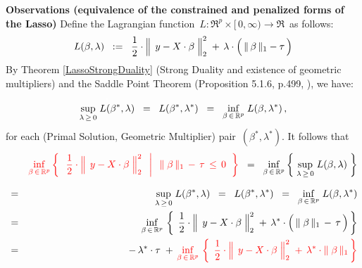 \vskip 0.5cm
\noindent
\textbf{Observations (equivalence of the constrained and penalized forms of the Lasso)}
\mbox{}
\vskip 0.2cm
\noindent
Define the Lagrangian function
\,$L : \Re^{p} \times [\,0,\infty) \longrightarrow \Re$\,
as follows:
\begin{equation*}
L(\beta,\lambda)
\;\; := \;\;
	\dfrac{1}{2}
	\cdot
	\left\Vert\;\, y \overset{{\color{white}.}}{-} X\cdot\beta \;\right\Vert_{2}^{2}
	\; + \,
	\lambda\cdot\left(\,\Vert\,\beta\,\Vert_{1} \overset{{\color{white}.}}{-} \tau\,\right)
\end{equation*}
By Theorem \ref{LassoStrongDuality} (Strong Duality and existence of geometric multipliers)
and the Saddle Point Theorem (Proposition 5.1.6, p.499, \cite{Bertsekas1999}),
we have:
\begin{equation*}
\overset{{\color{white}1}}{\underset{\lambda\,\geq\,0}{\sup}\; L(\beta^{*},\lambda)}
\;\; = \;\;
	L(\beta^{*},\lambda^{*})
\;\; = \;\;
	\underset{\beta\,\in\,\Re^{p}}{\inf}\; L(\beta,\lambda^{*})\,,
\end{equation*}
for each (Primal Solution, Geometric Multiplier) pair \,$(\beta^{*},\lambda^{*})$.
It follows that
\begin{eqnarray*}
&&
	{\color{red}\underset{\beta\,\in\,\Re^{p}}{\inf}
	\left\{\;\;
		\left.
		\dfrac{1}{2}
		\cdot
		\left\Vert\;\, y \overset{{\color{white}.}}{-} X\cdot\beta \;\right\Vert_{2}^{2}
		\;\;\,\right\vert\;\;
		\Vert\;\beta\,\Vert_{1} \, - \, \tau \, \leq \, 0
		\;\;\right\}}
\;\; = \;\;
	\underset{\beta\,\in\,\Re^{p}}{\inf}
	\left\{\;
		\underset{\lambda\,\geq\,0}{\sup}\; L(\beta,\lambda)
		\;\right\}
\\
& = &
	\overset{{\color{white}1}}{\underset{\lambda\,\geq\,0}{\sup}\; L(\beta^{*},\lambda)}
	\;\; = \;\;
		L(\beta^{*},\lambda^{*})
	\;\; = \;\;
		\underset{\beta\,\in\,\Re^{p}}{\inf}\; L(\beta,\lambda^{*})
\\
& = &
	\underset{\beta\,\in\,\Re^{p}}{\inf}\,
	\left\{\;\,
		\dfrac{1}{2}
		\cdot
		\left\Vert\;\, y \overset{{\color{white}.}}{-} X\cdot\beta \;\right\Vert_{2}^{2}
		\; + \,
		\lambda^{*}
		\cdot
		\left(\, \Vert\;\beta\,\Vert_{1} \, \overset{{\color{white}.}}{-} \, \tau \,\right) \,\right\}
\\
& = &
	-\,\lambda^{*}\cdot\tau
	\; + \,
	{\color{red}\underset{\beta\,\in\,\Re^{p}}{\inf}\,
	\left\{\;\,
		\dfrac{1}{2}
		\cdot
		\left\Vert\;\, y \overset{{\color{white}.}}{-} X\cdot\beta \;\right\Vert_{2}^{2}
		\; + \,
		\lambda^{*} \cdot \Vert\;\beta\,\Vert_{1} 
		\,\right\}}
\end{eqnarray*}
